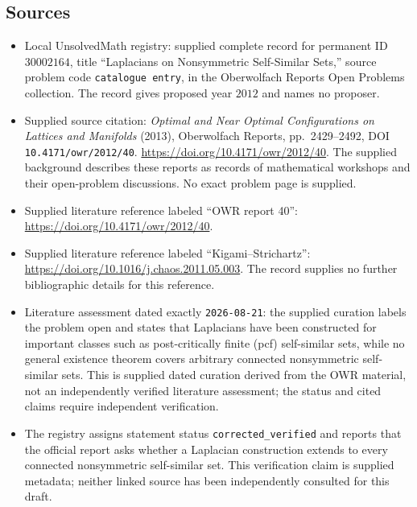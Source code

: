 \documentclass[11pt]{article}
\begin{document}
\subsection{Sources}
\begin{itemize}
\item Local UnsolvedMath registry: supplied complete record for permanent ID \(30002164\), title ``Laplacians on Nonsymmetric Self-Similar Sets,'' source problem code \texttt{catalogue entry}, in the Oberwolfach Reports Open Problems collection. The record gives proposed year \(2012\) and names no proposer.
\item Supplied source citation: \emph{Optimal and Near Optimal Configurations on Lattices and Manifolds} (2013), Oberwolfach Reports, pp.~2429--2492, DOI \texttt{10.4171/owr/2012/40}. \url{https://doi.org/10.4171/owr/2012/40}. The supplied background describes these reports as records of mathematical workshops and their open-problem discussions. No exact problem page is supplied.
\item Supplied literature reference labeled ``OWR report 40'': \url{https://doi.org/10.4171/owr/2012/40}.
\item Supplied literature reference labeled ``Kigami--Strichartz'': \url{https://doi.org/10.1016/j.chaos.2011.05.003}. The record supplies no further bibliographic details for this reference.
\item Literature assessment dated exactly \texttt{2026-08-21}: the supplied curation labels the problem open and states that Laplacians have been constructed for important classes such as post-critically finite (pcf) self-similar sets, while no general existence theorem covers arbitrary connected nonsymmetric self-similar sets. This is supplied dated curation derived from the OWR material, not an independently verified literature assessment; the status and cited claims require independent verification.
\item The registry assigns statement status \texttt{corrected\_verified} and reports that the official report asks whether a Laplacian construction extends to every connected nonsymmetric self-similar set. This verification claim is supplied metadata; neither linked source has been independently consulted for this draft.
\end{itemize}
\end{document}
